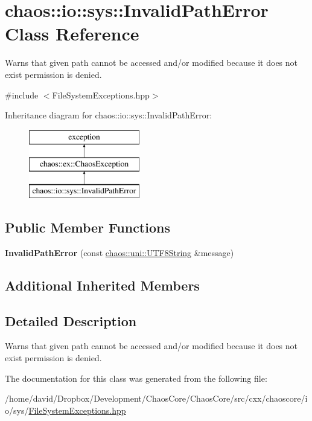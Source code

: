 \hypertarget{classchaos_1_1io_1_1sys_1_1_invalid_path_error}{\section{chaos\-:\-:io\-:\-:sys\-:\-:Invalid\-Path\-Error Class Reference}
\label{classchaos_1_1io_1_1sys_1_1_invalid_path_error}
}


Warns that given path cannot be accessed and/or modified because it does not exist permission is denied.  




{\ttfamily \#include $<$File\-System\-Exceptions.\-hpp$>$}

Inheritance diagram for chaos\-:\-:io\-:\-:sys\-:\-:Invalid\-Path\-Error\-:\begin{figure}[H]
\begin{center}
\leavevmode
\includegraphics[height=3.000000cm]{classchaos_1_1io_1_1sys_1_1_invalid_path_error}
\end{center}
\end{figure}
\subsection*{Public Member Functions}
\begin{DoxyCompactItemize}
\item 
\hypertarget{classchaos_1_1io_1_1sys_1_1_invalid_path_error_a132ec813c227f40ffe9f3e3d64618a68}{{\bfseries Invalid\-Path\-Error} (const \hyperlink{classchaos_1_1uni_1_1_u_t_f8_string}{chaos\-::uni\-::\-U\-T\-F8\-String} \&message)}\label{classchaos_1_1io_1_1sys_1_1_invalid_path_error_a132ec813c227f40ffe9f3e3d64618a68}

\end{DoxyCompactItemize}
\subsection*{Additional Inherited Members}


\subsection{Detailed Description}
Warns that given path cannot be accessed and/or modified because it does not exist permission is denied. 

The documentation for this class was generated from the following file\-:\begin{DoxyCompactItemize}
\item 
/home/david/\-Dropbox/\-Development/\-Chaos\-Core/\-Chaos\-Core/src/cxx/chaoscore/io/sys/\hyperlink{_file_system_exceptions_8hpp}{File\-System\-Exceptions.\-hpp}\end{DoxyCompactItemize}
